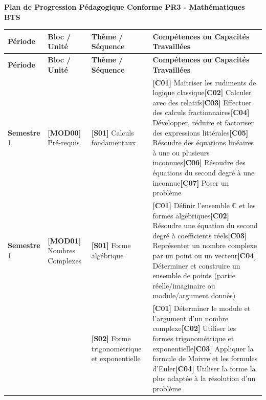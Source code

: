 \documentclass[a4paper,10pt,landscape]{article}
\begin{document}
\begin{center}
{\Large\bfseries Plan de Progression Pédagogique Conforme PR3 - Mathématiques BTS}
\end{center}
\vspace{4pt}

\renewcommand{\arraystretch}{1.15}
\begin{longtable}{>{\raggedright\arraybackslash}p{2.2cm} >{\raggedright\arraybackslash}p{3cm} >{\raggedright\arraybackslash}p{3.5cm} >{\raggedright\arraybackslash}p{13.2cm}}
\toprule
\textbf{Période} & \textbf{Bloc / Unité} & \textbf{Thème / Séquence} & \textbf{Compétences ou Capacités Travaillées} \\
\midrule
\endfirsthead
\toprule
\textbf{Période} & \textbf{Bloc / Unité} & \textbf{Thème / Séquence} & \textbf{Compétences ou Capacités Travaillées} \\
\midrule
\endhead
\textbf{Semestre 1} & \textbf{[MOD00]} Pré-requis & \textbf{[S01]} Calculs fondamentaux & \textbf{[C01]} Maîtriser les rudiments de logique classique\newline \textbf{[C02]} Calculer avec des relatifs\newline \textbf{[C03]} Effectuer des calculs fractionnaires\newline \textbf{[C04]} Développer, réduire et factoriser des expressions littérales\newline \textbf{[C05]} Résoudre des équations linéaires à une ou plusieurs inconnues\newline \textbf{[C06]} Résoudre des équations du second degré à une inconnue\newline \textbf{[C07]} Poser un problème \\
\midrule
\textbf{Semestre 1} & \textbf{[MOD01]} Nombres Complexes & \textbf{[S01]} Forme algébrique & \textbf{[C01]} Définir l'ensemble $\mathbb{C}$ et les formes algébriques\newline \textbf{[C02]} Résoudre une équation du second degré à coefficients réels\newline \textbf{[C03]} Représenter un nombre complexe par un point ou un vecteur\newline \textbf{[C04]} Déterminer et construire un ensemble de points (partie réelle/imaginaire ou module/argument donnés) \\
\cmidrule(l){3-4}
 &  & \textbf{[S02]} Forme trigonométrique et exponentielle & \textbf{[C01]} Déterminer le module et l'argument d'un nombre complexe\newline \textbf{[C02]} Utiliser les formes trigonométrique et exponentielle\newline \textbf{[C03]} Appliquer la formule de Moivre et les formules d'Euler\newline \textbf{[C04]} Utiliser la forme la plus adaptée à la résolution d'un problème \\

\end{longtable}
\end{document}
